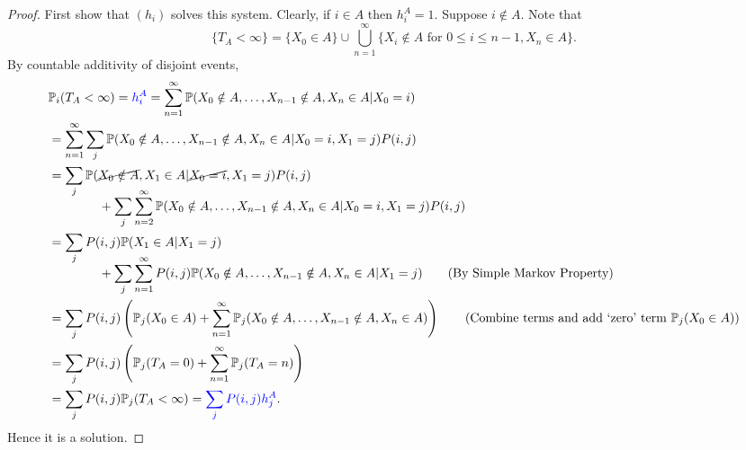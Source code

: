 \documentclass[a4paper,11pt]{article}
\begin{document}
\begin{proof}
	First show that $(h_i)$ solves this system. Clearly, if $i\in A$ then $ h_i^A=1 $. Suppose $i\notin A$. Note that 
    \[
        \{T_A<\infty\} = \{X_0\in A\} \cup \bigcup_{n=1}^{\infty}\{X_i\notin A \text{ for }0\le i\le n-1, X_n\in A\}.
    \]
    By countable additivity of disjoint events,
    \begin{align*}
        &\mathbb{P}_i(T_A< \infty)={\color{blue}h_i^A} =\sum_{n=1}^{\infty}\mathbb{P}(X_0\notin A,\dots,X_{n-1}\notin A, X_n\in A|X_0=i)\\ 
            &= \sum_{n=1}^{\infty} \sum_{j} \mathbb{P}(X_0\notin A,\dots,X_{n-1}\notin A, X_n\in A|X_0=i,X_1=j)P(i,j)\\ 
            &=\sum_j \mathbb{P}(\cancel{X_0\notin A}, X_1\in A|\cancel{X_0=i},X_1=j)P(i,j)\\[-1em]
            &\hspace{4em}+\sum_j \sum_{n=2}^{\infty}\mathbb{P}(X_0\notin A,\dots,X_{n-1}\notin A, X_n\in A|X_0=i,X_1=j)P(i,j)\\ 
            &=\sum_j P(i,j)\mathbb{P}(X_1\in A|X_1=j)\\[-1em]
            &\hspace{4em}+\sum_j \sum_{n=1}^{\infty}P(i,j)\mathbb{P}(X_0\notin A,\dots,X_{n-1}\notin A, X_n\in A|X_1=j)\tag{By Simple Markov Property} \\
            &= \sum_j P(i,j) \left( \mathbb{P}_j(X_0\in A)+\sum_{n=1}^{\infty} \mathbb{P}_j(X_0\notin A,\dots,X_{n-1}\notin A, X_n\in A)\right)\tag{Combine terms and add `zero' term $\mathbb{P}_j(X_0\in A)$}\\ 
            &= \sum_j P(i,j) \left( \mathbb{P}_j(T_A=0)+ \sum_{n=1}^{\infty}\mathbb{P}_j(T_A=n) \right)\\ 
            &= \sum_j P(i,j) \bbP_j(T_A< \infty ) = {\color{blue}\sum_j P(i,j)h_j^A}.
    \end{align*}
    Hence it is a solution.


\end{proof}
\end{document}
